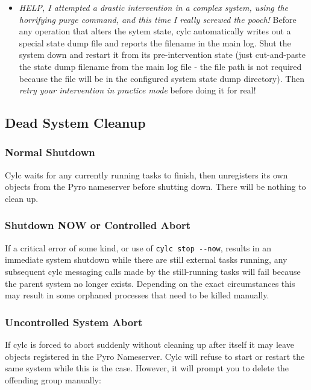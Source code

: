\documentclass[11pt,a4paper]{article}
\begin{document}
\begin{itemize}
    \item {\em HELP, I attempted a drastic intervention in a complex
        system, using the horrifying purge command, and this time I
        really screwed the pooch!} Before any operation that alters the
        sytem state, cylc automatically writes out a special state dump
        file and reports the filename in the main log. Shut the system
        down and restart it from its pre-intervention state (just
        cut-and-paste the state dump filename from the main log file -
        the file path is not required because the file will be in the
        configured system state dump directory).  Then {\em retry your
        intervention in practice mode} before doing it for real!

\end{itemize}

\subsection{Dead System Cleanup}
\label{DeadSystemCleanup}

\subsubsection{Normal Shutdown}

Cylc waits for any currently running tasks to finish, then
unregisters its own objects from the Pyro nameserver before shutting
down. There will be nothing to clean up. 

\subsubsection{Shutdown NOW or Controlled Abort}

If a critical error of some kind, or use of \lstinline=cylc stop --now=,
results in an immediate system shutdown while there are still external
tasks running, any subsequent cylc messaging calls made by the
still-running tasks will fail because the parent system no longer
exists. Depending on the exact circumstances this may result in some 
orphaned processes that need to be killed manually.

\subsubsection{Uncontrolled System Abort}

If cylc is forced to abort suddenly without cleaning up after itself it
may leave objects registered in the Pyro Nameserver. Cylc will refuse
to start or restart the same system while this is the case. However, it
will prompt you to delete the offending group manually:
\end{document}
